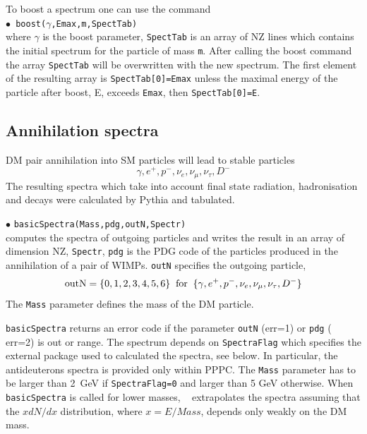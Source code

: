 \documentclass[12pt,a4paper]{article}
\begin{document}
To boost a spectrum one can use the command \\
$\bullet$\verb| boost(|$\gamma$\verb|,Emax,m,SpectTab)|\\
where $\gamma$ is the boost parameter, {\tt SpectTab} is an array of NZ lines which contains the initial spectrum  for the particle of mass \verb|m|. After calling the boost command  the array  {\tt SpectTab} will be overwritten with the new spectrum. The first element of the resulting array is {\tt SpectTab[0]=Emax} unless the maximal energy of the particle after boost, E,  exceeds {\tt Emax}, then {\tt SpectTab[0]=E}.



\subsection{Annihilation spectra}
\label{A_Spectra}

DM pair  annihilation into  SM particles will lead to stable particles
\begin{equation}
\label{outN} 
  \gamma,   e^+,  p^-, \nu_e, \nu_{\mu},\nu_\tau,D^-
\end{equation}
The resulting spectra which take into account final state radiation, hadronisation  and decays were  calculated by Pythia and tabulated. 

\noindent
$\bullet$ \verb|basicSpectra(Mass,pdg,outN,Spectr)|\\
computes the spectra of outgoing particles and writes the result in an array of dimension NZ, \verb|Spectr|,
\verb|pdg| is the PDG code of the particles produced in the annihilation of a pair of 
WIMPs.  \verb|outN|  specifies the outgoing particle,
$$ {\rm outN} = \{0,1,2,3,4,5,6\} \;\; {\rm for}\;\; \{\gamma,   e^+,  p^-, \nu_e,
\nu_{\mu},\nu_{\tau},D^-\} $$
The {\tt Mass} parameter defines the mass of the DM particle.


{\tt basicSpectra} returns an error code if the  parameter {\tt outN} (err=1) or {\tt pdg} ( err=2) is out or range.   
The spectrum  depends on  {\tt SpectraFlag} which specifies the external package used to calculated the  spectra, see below.
In particular, the antideuterons spectra is provided  only within  PPPC.
The {\tt Mass} parameter has to be larger than 2~GeV if {\tt SpectraFlag=0} and larger than 5 GeV otherwise. 
When \verb|basicSpectra| is  called for lower masses, \micro~  extrapolates the spectra  assuming that the  $xdN/dx$ distribution, where $x= E/Mass$, depends only weakly on the  DM mass.    
\end{document}
